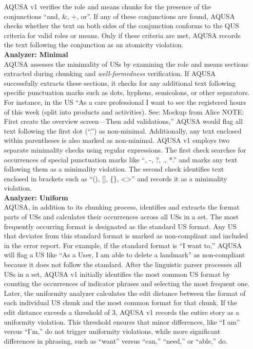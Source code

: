 AQUSA v1 verifies the role and means chunks for the presence of the conjunctions \enquote{and, \&, +, or}. If any of these conjunctions are found, AQUSA checks whether the text on both sides of the conjunction conforms to the QUS criteria for valid roles or means. Only if these criteria are met, AQUSA records the text following the conjunction as an atomicity violation. \\ 
\textbf{Analyzer: Minimal}\\ 
AQUSA assesses the minimality of USs by examining the role and means sections extracted during chunking and \emph{well-formedness} verification. If AQUSA successfully extracts these sections, it checks for any additional text following specific punctuation marks such as dots, hyphens, semicolons, or other separators. For instance, in the US \enquote{As a care professional I want to see the registered hours of this week (split into products and activities). See: Mockup from Alice NOTE: First create the overview screen—Then add validations,} AQUSA would flag all text following the first dot (\enquote{.}) as non-minimal. Additionally, any text enclosed within parentheses is also marked as non-minimal.
AQUSA v1 employs two separate minimality checks using regular expressions. The first check searches for occurrences of special punctuation marks like \enquote{, -, ?, ., *.} and marks any text following them as a minimality violation. The second check identifies text enclosed in brackets such as \enquote{(), [], \{\}, \textless\textgreater} and records it as a minimality violation. \\ 
\textbf{Analyzer: Uniform}\\ 
AQUSA, in addition to its chunking process, identifies and extracts the format parts of USs and calculates their occurrences across all USs in a set. The most frequently occurring format is designated as the standard US format. Any US that deviates from this standard format is marked as non-compliant and included in the error report. For example, if the standard format is \enquote{I want to,} AQUSA will flag a US like \enquote{As a User, I am able to delete a landmark} as non-compliant because it does not follow the standard.
After the linguistic parser processes all USs in a set, AQUSA v1 initially identifies the most common US format by counting the occurrences of indicator phrases and selecting the most frequent one. Later, the uniformity analyzer calculates the edit distance between the format of each individual US chunk and the most common format for that chunk. If the edit distance exceeds a threshold of 3, AQUSA v1 records the entire story as a uniformity violation. This threshold ensures that minor differences, like \enquote{I am} versus \enquote{I'm,} do not trigger uniformity violations, while more significant differences in phrasing, such as \enquote{want} versus \enquote{can,} \enquote{need,} or \enquote{able,} do. \\ 

